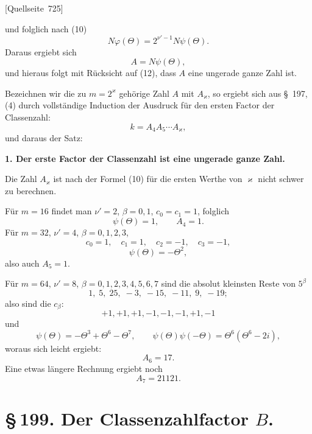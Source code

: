 \documentclass[11pt]{article}
\newcommand{\srcpage}[1]{\par\medskip\noindent\textsf{[Quellseite~#1]}\par\smallskip}
\begin{document}
\srcpage{725}
und folglich nach (10)
\[
N\varphi(\Theta)=2^{\nu'-1}N\psi(\Theta).
\]
Daraus ergiebt sich
\begin{equation}
A=N\psi(\Theta),
\tag{13}
\end{equation}
und hieraus folgt mit Rücksicht auf (12), dass $A$ eine ungerade ganze Zahl ist.

Bezeichnen wir die zu $m=2^\varkappa$ gehörige Zahl $A$ mit $A_\varkappa$, so ergiebt sich aus \S~197, (4) durch vollständige Induction der Ausdruck für den ersten Factor der Classenzahl:
\begin{equation}
k=A_4A_5\cdots A_\varkappa,
\tag{14}
\end{equation}
und daraus der Satz:
\begin{center}
\textbf{1. Der erste Factor der Classenzahl ist eine ungerade ganze Zahl.}
\end{center}
Die Zahl $A_\varkappa$ ist nach der Formel (10) für die ersten Werthe von $\varkappa$ nicht schwer zu berechnen.

Für $m=16$ findet man $\nu'=2$, $\beta=0,1$, $c_0=c_1=1$, folglich
\[
\psi(\Theta)=1,
\qquad
A_4=1.
\]
Für $m=32$, $\nu'=4$, $\beta=0,1,2,3$,
\[
c_0=1,
\quad c_1=1,
\quad c_2=-1,
\quad c_3=-1,
\]
\[
\psi(\Theta)=-\Theta^2,
\]
also auch $A_5=1$.

Für $m=64$, $\nu'=8$, $\beta=0,1,2,3,4,5,6,7$ sind die absolut kleinsten Reste von $5^\beta$
\[
1,\;5,\;25,\;-3,\;-15,\;-11,\;9,\;-19;
\]
also sind die $c_\beta$:
\[
+1,+1,+1,-1,-1,-1,+1,-1
\]
und
\[
\psi(\Theta)=-\Theta^3+\Theta^6-\Theta^7,
\qquad
\psi(\Theta)\psi(-\Theta)=\Theta^6(\Theta^6-2i),
\]
woraus sich leicht ergiebt:
\[
A_6=17.
\]
Eine etwas längere Rechnung ergiebt noch
\[
A_7=21121.
\]

\section*{\S\,199. Der Classenzahlfactor $B$.}
\end{document}
